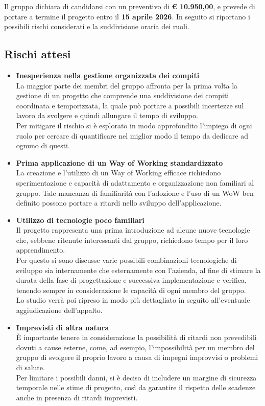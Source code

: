 \documentclass[a4paper,10pt]{article}
\begin{document}
Il gruppo dichiara di candidarsi con un preventivo di \textbf{€ 10.950,00}, e prevede di portare a termine il progetto entro il \textbf{15 aprile 2026}. In seguito si riportano i possibili rischi considerati e la suddivisione oraria dei ruoli.

\subsection*{Rischi attesi}
\begin{itemize}
\item\textbf{Inesperienza nella gestione organizzata dei compiti}\\
La maggior parte dei membri del gruppo affronta per la prima volta la gestione di un progetto che comprende una suddivisione dei compiti coordinata e temporizzata, la quale può portare a possibili incertezze sul lavoro da svolgere e quindi allungare il tempo di sviluppo.\\
Per mitigare il rischio si è esplorato in modo approfondito l'impiego di ogni ruolo per cercare di quantificare nel miglior modo il tempo da dedicare ad ognuno di questi.
\item\textbf{Prima applicazione di un Way of Working standardizzato}\\
La creazione e l'utilizzo di un Way of Working efficace richiedono sperimentazione e capacità di adattamento e organizzazione non familiari al gruppo.
Tale mancanza di familiarità con l'adozione e l'uso di un WoW ben definito possono portare a ritardi nello sviluppo dell'applicazione.

\item\textbf{Utilizzo di tecnologie poco familiari}\\
Il progetto rappresenta una prima introduzione ad alcune nuove tecnologie che, sebbene ritenute interessanti dal gruppo, richiedono tempo per il loro apprendimento.\\
Per questo si sono discusse varie possibili combinazioni tecnologiche di sviluppo sia internamente che esternamente con l'azienda, al fine di stimare la durata della fase di progettazione e successiva implementazione e verifica, tenendo sempre in considerazione le capacità di ogni membro del gruppo.\\
Lo studio verrà poi ripreso in modo più dettagliato in seguito all'eventuale aggiudicazione dell'appalto.
\item\textbf{Imprevisti di altra natura}\\
È importante tenere in considerazione la possibilità di ritardi non prevedibili dovuti a cause esterne, come, ad esempio, l'impossibilità per un membro del gruppo di svolgere il proprio lavoro a causa di impegni improvvisi o problemi di salute.\\
Per limitare i possibili danni, si è deciso di includere un margine di sicurezza temporale nelle stime di progetto, così da garantire il rispetto delle scadenze anche in presenza di ritardi imprevisti. 

\end{itemize}
\end{document}

